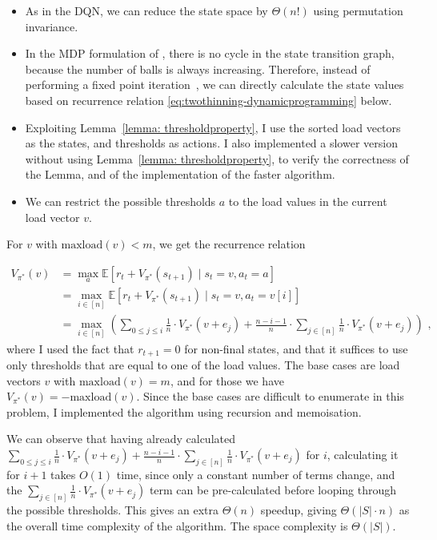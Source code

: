 \begin{itemize}
    \item 
    As in the DQN, we can reduce the state space by $\Theta(n!)$ using permutation invariance.
    \item
    In the MDP formulation of \TwoThinning, there is no cycle in the state transition graph, because the number of balls is always increasing. Therefore, instead of performing a fixed point iteration~\cite{rhoades1991fixedpointiteration}, we can directly calculate the state values based on recurrence relation \eqref{eq:twothinning-dynamicprogramming} below.
    \item
    Exploiting Lemma~\ref{lemma: thresholdproperty}, I use the sorted load vectors as the states, and thresholds as actions. I also implemented a slower version without using Lemma~\ref{lemma: thresholdproperty}, to verify the correctness of the Lemma, and of the implementation of the faster algorithm.
    \item
    We can restrict the possible thresholds $a$ to the load values in the current load vector $v$. 
\end{itemize}


For $v$ with $\mathrm{maxload}(v)<m$, we get the recurrence relation

\begin{equation} \label{eq:twothinning-dynamicprogramming}
\begin{split}
    V_{\pi^*}(v) &= \max_a \mathbb{E} [r_t + V_{\pi^*}(s_{t+1}) \mid s_t=v, a_t=a] \\
    &= \max_{i \in [n]} \mathbb{E} [r_t + V_{\pi^*}(s_{t+1}) \mid s_t=v, a_t=v[i]] \\
    &= \max_{i \in [n]} \left(\sum_{0\leq j \leq i} \frac{1}{n}\cdot V_{\pi^*}(v+e_j) + \frac{n-i-1}{n} \cdot  \sum_{j \in [n]} \frac{1}{n}\cdot V_{\pi^*}(v+e_j) \right) \text{ ,}
\end{split}
\end{equation}
where I used the fact that $r_{t+1}=0$ for non-final states, and that it suffices to use only thresholds that are equal to one of the load values. The base cases are load vectors $v$ with $\mathrm{maxload}(v)=m$, and for those we have $V_{\pi^*}(v)=-\mathrm{maxload}(v)$. Since the base cases are difficult to enumerate in this problem, I implemented the algorithm using recursion and memoisation. 


We can observe that having already calculated $\sum_{0\leq j \leq i} \frac{1}{n}\cdot V_{\pi^*}(v+e_j) + \frac{n-i-1}{n} \cdot  \sum_{j \in [n]} \frac{1}{n}\cdot V_{\pi^*}(v+e_j)$ for $i$, calculating it for $i+1$ takes $O(1)$ time, since only a constant number of terms change, and the $\sum_{j \in [n]} \frac{1}{n}\cdot V_{\pi^*}(v+e_j)$ term can be pre-calculated before looping through the possible thresholds. This gives an extra $\Theta(n)$ speedup, giving $\Theta(|S|\cdot n)$ as the overall time complexity of the algorithm. The space complexity is $\Theta(|S|)$.\\


